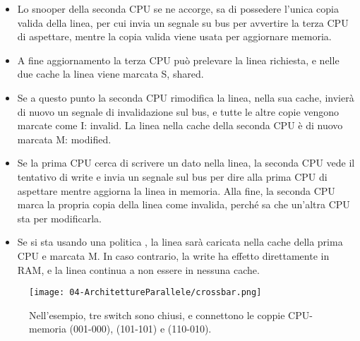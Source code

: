 \begin{itemize}
  \item Lo snooper
della seconda CPU se ne accorge, sa di possedere l’unica copia valida della
linea, per cui invia un segnale su bus per avvertire la terza CPU di
aspettare, mentre la copia valida viene usata per aggiornare
memoria.
\item A fine aggiornamento la terza CPU può prelevare la linea richiesta, e nelle
due cache la linea viene marcata S, shared.
\item Se a questo punto la seconda CPU rimodifica la linea, nella sua
cache, invierà di nuovo un segnale di invalidazione sul bus, e tutte
le altre copie vengono marcate come
I: invalid. La linea nella cache della seconda CPU è di nuovo marcata M:
modified.
\item Se la prima CPU cerca di scrivere un dato nella linea, la seconda CPU vede
il tentativo di write e invia un segnale sul bus per dire alla prima CPU 
di aspettare mentre aggiorna la linea in memoria. Alla fine, la seconda CPU 
marca la propria copia della linea come invalida, perché sa che
un’altra CPU sta per modificarla.
\item Se si sta usando una politica , la linea sarà caricata
nella cache della prima CPU e marcata M. In caso contrario, la write ha effetto direttamente in RAM, e la linea
continua a non essere in nessuna cache.
\end{itemize}


\begin{figure}[h]
    \centering
    \texttt{[image: 04-ArchitettureParallele/crossbar.png]}
    \caption{Nell’esempio, tre switch sono chiusi, e connettono le coppie CPU-
memoria (001-000), (101-101) e (110-010).}
\end{figure}

